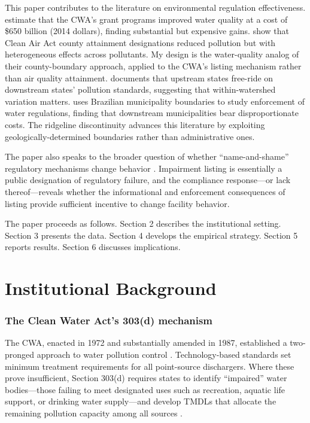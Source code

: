 \documentclass[12pt]{article}
\begin{document}
This paper contributes to the literature on environmental regulation effectiveness. \citet{keiser2019consequences} estimate that the CWA's grant programs improved water quality at a cost of \$650 billion (2014 dollars), finding substantial but expensive gains. \citet{greenstone2012does} show that Clean Air Act county attainment designations reduced pollution but with heterogeneous effects across pollutants. My design is the water-quality analog of their county-boundary approach, applied to the CWA's listing mechanism rather than air quality attainment. \citet{sigman2005transboundary} documents that upstream states free-ride on downstream states' pollution standards, suggesting that within-watershed variation matters. \citet{lipscomb2012crossing} uses Brazilian municipality boundaries to study enforcement of water regulations, finding that downstream municipalities bear disproportionate costs. The ridgeline discontinuity advances this literature by exploiting geologically-determined boundaries rather than administrative ones.

The paper also speaks to the broader question of whether ``name-and-shame'' regulatory mechanisms change behavior \citep{dranove2003quality, jin2003producer}. Impairment listing is essentially a public designation of regulatory failure, and the compliance response---or lack thereof---reveals whether the informational and enforcement consequences of listing provide sufficient incentive to change facility behavior.

The paper proceeds as follows. Section 2 describes the institutional setting. Section 3 presents the data. Section 4 develops the empirical strategy. Section 5 reports results. Section 6 discusses implications.


\section{Institutional Background}

\subsubsection*{The Clean Water Act's 303(d) mechanism} The CWA, enacted in 1972 and substantially amended in 1987, established a two-pronged approach to water pollution control \citep{keiser2019us}. Technology-based standards set minimum treatment requirements for all point-source dischargers. Where these prove insufficient, Section 303(d) requires states to identify ``impaired'' water bodies---those failing to meet designated uses such as recreation, aquatic life support, or drinking water supply---and develop TMDLs that allocate the remaining pollution capacity among all sources \citep{epa2024ir}.
\end{document}
